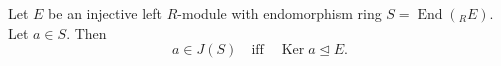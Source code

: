 Let $E$ be an injective left $R$-module with endomorphism ring $S = \operatorname{End}({}_R E)$. Let $a \in S$. Then
$$a \in J(S) \quad \text{iff} \quad \operatorname{Ker} a \trianglelefteq E.$$
